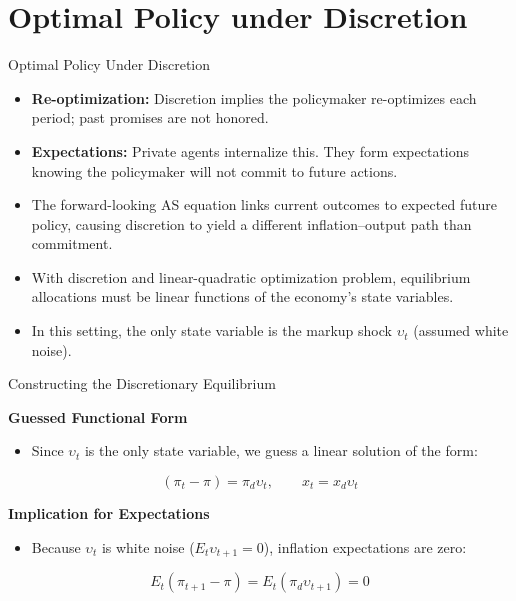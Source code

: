 \documentclass[11pt,aspectratio=169]{beamer}
\begin{document}
\section{Optimal Policy under Discretion\label{Chapter7-D}}

\begin{frame}{Optimal Policy Under Discretion}
\small

\begin{itemize}
    \item \textbf{Re-optimization:} Discretion implies the policymaker re-optimizes each period; past promises are not honored.
    \item \textbf{Expectations:} Private agents internalize this. They form expectations knowing the policymaker will not commit to future actions.
    \item The forward-looking AS equation links current outcomes to expected future policy, causing discretion to yield a different inflation–output path than commitment.
    \item With discretion and linear-quadratic optimization problem, equilibrium allocations must be linear functions of the economy’s state variables.
    \item In this setting, the only state variable is the markup shock $\upsilon_t$ (assumed white noise).
\end{itemize}

\end{frame}

\begin{frame}{Constructing the Discretionary Equilibrium}
\small

\textbf{Guessed Functional Form}
\begin{itemize}
    \item Since $\upsilon_t$ is the only state variable, we guess a linear solution of the form:
\end{itemize}

\begin{equation*}
(\pi_t - \pi) = \pi_d \upsilon_t, \qquad x_t = x_d \upsilon_t
\end{equation*}

\textbf{Implication for Expectations}
\begin{itemize}
    \item Because $\upsilon_t$ is white noise ($E_t \upsilon_{t+1} = 0$), inflation expectations are zero:
\end{itemize}

\begin{equation*}
E_t(\pi_{t+1}-\pi) = E_t(\pi_d \upsilon_{t+1}) = 0
\end{equation*}

\end{frame}
\end{document}
